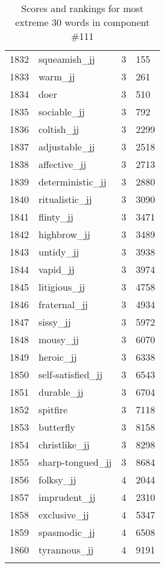\begin{longtable}[!htbp]{| rlr@{.}l |}
    1832 & squeamish\_jj & 3 & 155 \\
    1833 & warm\_jj & 3 & 261 \\
    1834 & doer & 3 & 510 \\
    1835 & sociable\_jj & 3 & 792 \\
    1836 & coltish\_jj & 3 & 2299 \\
    1837 & adjustable\_jj & 3 & 2518 \\
    1838 & affective\_jj & 3 & 2713 \\
    1839 & deterministic\_jj & 3 & 2880 \\
    1840 & ritualistic\_jj & 3 & 3090 \\
    1841 & flinty\_jj & 3 & 3471 \\
    1842 & highbrow\_jj & 3 & 3489 \\
    1843 & untidy\_jj & 3 & 3938 \\
    1844 & vapid\_jj & 3 & 3974 \\
    1845 & litigious\_jj & 3 & 4758 \\
    1846 & fraternal\_jj & 3 & 4934 \\
    1847 & sissy\_jj & 3 & 5972 \\
    1848 & mousy\_jj & 3 & 6070 \\
    1849 & heroic\_jj & 3 & 6338 \\
    1850 & self-satisfied\_jj & 3 & 6543 \\
    1851 & durable\_jj & 3 & 6704 \\
    1852 & spitfire & 3 & 7118 \\
    1853 & butterfly & 3 & 8158 \\
    1854 & christlike\_jj & 3 & 8298 \\
    1855 & sharp-tongued\_jj & 3 & 8684 \\
    1856 & folksy\_jj & 4 & 2044 \\
    1857 & imprudent\_jj & 4 & 2310 \\
    1858 & exclusive\_jj & 4 & 5347 \\
    1859 & spasmodic\_jj & 4 & 6508 \\
    1860 & tyrannous\_jj & 4 & 9191 \\
    \hline
    \caption{Scores and rankings for most extreme 30 words in component \#111} \\
\end{longtable}

